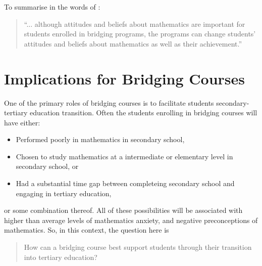\documentclass[twoside,12pt,a4paper]{report}
\begin{document}
To summarise in the words of :
\begin{quote}
``... although attitudes and beliefs about mathematics are important for students
enrolled in bridging programs, the programs can change students' attitudes and
beliefs about mathematics as well as their achievement.''
\end{quote}












\section{Implications for Bridging Courses}
\label{sec:literatureRecommendations}

One of the primary roles of bridging courses is to facilitate students secondary-tertiary education transition. Often the students enrolling in bridging courses will have either:\begin{itemize}
	\item Performed poorly in mathematics in secondary school, 
	\item Chosen to study mathematics at a intermediate or elementary level in secondary school, or
	\item Had a substantial time gap between completeing secondary school and engaging in tertiary education,
\end{itemize}
or some combination thereof. All of these possibilities will be associated with higher than average levels of mathematics anxiety, and negative preconceptions of mathematics. So, in this context, the question here is

\begin{quote}
How can a bridging course best support students through their transition into tertiary education?
\end{quote}
\end{document}

